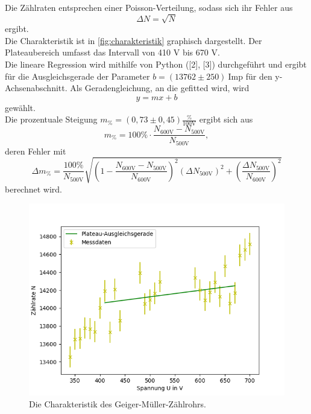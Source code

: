 Die Zählraten entsprechen einer Poisson-Verteilung, sodass sich ihr Fehler aus 
\begin{equation*}
  \Delta N = \sqrt{N}
\end{equation*}
ergibt.\\
Die Charakteristik ist in \autoref{fig:charakteristik} graphisch dargestellt.
Der Plateaubereich umfasst das Intervall von 410 V bis 670 V.\\
Die lineare Regression wird mithilfe von Python ([2], [3]) durchgeführt und ergibt
für die Ausgleichsgerade der Parameter $b = (13762 \pm 250)  \: \mathrm{Imp}$ für den y-Achsenabschnitt.
Als Geradengleichung, an die gefitted wird, wird 
\begin{equation*}
  y = mx + b
\end{equation*}
gewählt.\\
Die prozentuale Steigung $m_{\%} = (0,73 \pm 0,45) \mathrm{\frac{\%}{100 V}}$ ergibt sich aus 
\begin{equation*}
  m_{\%} = 100\% \cdot \frac{N_{\mathrm{600V}} - N_{\mathrm{500V}}}{N_{\mathrm{500V}}},
\end{equation*}
deren Fehler mit
\begin{equation*}
  \Delta m_{\%} = \frac{100\%}{N_{\mathrm{500V}}} \sqrt{(1 - \frac{N_{\mathrm{600V}} - N_{\mathrm{500V}}}{N_{\mathrm{600V}}})^2 (\Delta N_{\mathrm{500V}})^2 + (\frac{\Delta N_{\mathrm{500V}}}{N_{\mathrm{600V}}})^2}
\end{equation*}
berechnet wird.

\begin{figure}[H]
  \centering
  \includegraphics{content/hobelneu.png}
  \caption{Die Charakteristik des Geiger-Müller-Zählrohrs.}
  \label{fig:charakteristik}
\end{figure}


